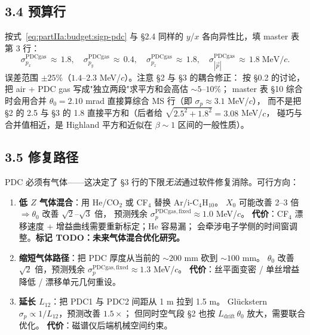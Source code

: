 \subsection*{3.4 预算行}

按式~\eqref{eq:partIIa:budget:sigp-pdc} 与 §2.4 同样的 $y$/$x$ 各向异性比，填 master 表第 3 行：
\begin{equation}
  \sigma_{p_x}^\mathrm{PDCgas}\,\approx\,1.8,\quad
  \sigma_{p_y}^\mathrm{PDCgas}\,\approx\,0.4,\quad
  \sigma_{p_z}^\mathrm{PDCgas}\,\approx\,1.8,\quad
  \sigma_{|\vec p|}^\mathrm{PDCgas}\,\approx\,1.8\;\mathrm{MeV}/c.
  \label{eq:partIIa:budget:row3}
\end{equation}
误差范围 $\pm 25\%$（$1.4$--$2.3$ MeV/$c$）。注意 §2 与 §3 的耦合修正：
按 §0.2 的讨论，把 air + PDC gas 写成"独立两段"求平方和会高估 $\sim 5$--$10\%$；
master 表 §10 综合时会用合并 $\theta_0=2.10$ mrad 直接算综合 MS 行（即 $\sigma_p\approx 3.1$ MeV/$c$），
而不是把 §2 的 2.5 与 §3 的 1.8 直接平方和（后者给 $\sqrt{2.5^2+1.8^2}=3.08$ MeV/$c$，
碰巧与合并值相近，是 Highland 平方和近似在 $\beta\sim 1$ 区间的一般性质）。

\subsection*{3.5 修复路径}

PDC 必须有气体——这决定了 §3 行的下限\emph{无法}通过软件修复消除。可行方向：
\begin{enumerate}
  \item \textbf{低 $Z$ 气体混合}：用 He/CO$_2$ 或 CF$_4$ 替换 Ar/i-C$_4$H$_{10}$。
        $X_0$ 可能改善 2--3 倍 $\Rightarrow \theta_0$ 改善 $\sqrt 2$--$\sqrt 3$ 倍，
        预测残余 $\sigma_p^\mathrm{PDCgas, fixed}\approx 1.0$ MeV/$c$。
        \textbf{代价}：CF$_4$ 漂移速度 + 增益曲线需要重新标定；He 容易漏；
        会牵涉电子学侧的时间窗调整。\textbf{标记 TODO：未来气体混合优化研究。}
  \item \textbf{缩短气体路径}：把 PDC 厚度从当前的 $\sim 200$ mm 砍到 $\sim 100$ mm。
        $\theta_0$ 改善 $\sqrt 2$ 倍，预测残余 $\sigma_p^\mathrm{PDCgas, fixed}\approx 1.3$ MeV/$c$。
        \textbf{代价}：丝平面变密 / 单丝增益降低 / 漂移单元几何重设。
  \item \textbf{延长 $L_{12}$}：把 PDC1 与 PDC2 间距从 1 m 拉到 1.5 m。
        Glückstern $\sigma_p \propto 1/L_{12}$，预测改善 $1.5\times$；
        但同时空气段 §2 也按 $L_\mathrm{drift}\,\theta_0$ 放大，需要联合优化。
        \textbf{代价}：磁谱仪后端机械空间约束。
\end{enumerate}

